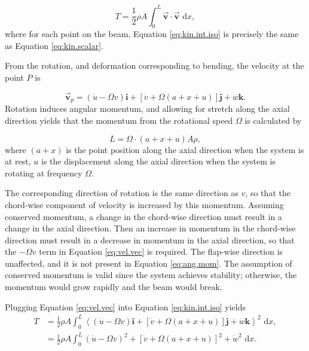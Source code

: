 \begin{equation}
T = \frac{1}{2}\rho A\int_{0}^{L}\vec{\textbf{v}}\cdot\vec{\textbf{v}}\text{ d}x,
\label{eq:kin.int.iso}
\end{equation}
where for each point on the beam, Equation \ref{eq:kin.int.iso} is precisely the same as Equation \ref{eq:kin.scalar}.

From the rotation, and deformation corresponding to bending, the velocity at the point $P$ is

\begin{equation}
\vec{\textbf{v}}_p = (\dot u-\Omega v)\textbf{i}+[\dot v+\Omega(a+x+u)]\textbf{j}+ \dot w\textbf{k}.
\label{eq:vel.vec}
\end{equation}
Rotation induces angular momentum, and allowing for stretch along the axial direction yields that the momentum from the rotational speed $\Omega$ is calculated by

\begin{equation}
L = \Omega\cdot(a+x+u) A\rho,
\label{eq:ang.mom}
\end{equation}
where $(a+x)$ is the point position along the axial direction when the system is at rest, $u$ is the displacement along the axial direction when the system is rotating at frequency $\Omega$.

The corresponding direction of rotation is the same direction as $v$, so that the chord-wise component of velocity is increased by this momentum. Assuming conserved momentum, a change in the chord-wise direction must result in a change in the axial direction. Then an increase in momentum in the chord-wise direction must result in a decrease in momentum in the axial direction, so that the $-\Omega v$ term in Equation \ref{eq:vel.vec} is required.  The flap-wise direction is unaffected, and it is not present in Equation \ref{eq:ang.mom}. The assumption of conserved momentum is valid since the system achieves stability; otherwise, the momentum would grow rapidly and the beam would break. 

Plugging Equation \ref{eq:vel.vec} into Equation \ref{eq:kin.int.iso} yields
\begin{align}
T &= \frac{1}{2}\rho A\int_{0}^{L}\left\langle(\dot u-\Omega v)\textbf{i}+[\dot v+\Omega(a+x+u)]\textbf{j}+ \dot w\textbf{k}\right\rangle^2\text{ d}x, \\
  &= \frac{1}{2}\rho A\int_{0}^{L} (\dot u-\Omega v)^2+[\dot v+\Omega(a+x+u)]^2+\dot w^2\text{ d}x.
  \label{eq:kin.final}
\end{align}

